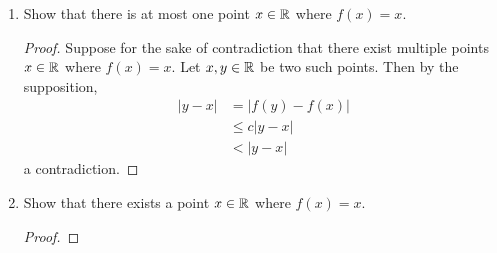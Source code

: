 \documentclass[../main.tex]{subfiles}
\begin{document}
\begin{enumerate}
\begin{enumerate}
\begin{proof}
            To prove that $f$ is continuous, Theorem \ref{trm:13.2} tells us that it will suffice to show that $f$ is uniformly continuous. To do this, Definition \ref{dfn:13.1} tells us that it will suffice to verify that for all $\epsilon>0$, there exists a $\delta>0$ such that for all $x,y\in\R$, if $|y-x|<\delta$, then $|f(y)-f(x)|<\epsilon$. Let $\epsilon>0$ be arbitrary. Choose $\delta=\epsilon$. Let $x,y$ be arbitrary real numbers such that $|y-x|<\delta$. Then by the supposition,
            \begin{align*}
                |f(y)-f(x)| &\leq c|y-x|\\
                &< |y-x|\\
                &< \delta\\
                &= \epsilon
            \end{align*}
            as desired.
        \end{proof}
        \item Show that there is at most one point $x\in\mathbb{R}$ where $f(x)=x$.
        \begin{proof}

            Suppose for the sake of contradiction that there exist multiple points $x\in\mathbb{R}$ where $f(x)=x$. Let $x,y\in\R$ be two such points. Then by the supposition,
            \begin{align*}
                |y-x| &= |f(y)-f(x)|\\
                &\leq c|y-x|\\
                &< |y-x|
            \end{align*}
            a contradiction.
        \end{proof}
        \item Show that there exists a point $x\in\mathbb{R}$ where $f(x)=x$.
        \begin{proof}



\end{proof}
\end{enumerate}
\end{enumerate}
\end{document}
